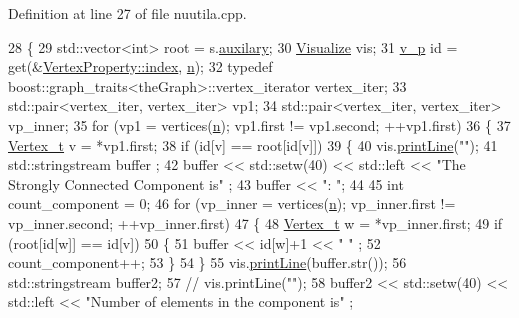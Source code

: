 Definition at line 27 of file nuutila.\+cpp.


\begin{DoxyCode}
28 \{
29     std::vector<int> root = s.\hyperlink{struct_utility_structs_1_1_storage_items_afb9d346eaacb1c5e7f60f559c45910f2}{auxilary}; 
30     \hyperlink{class_visualize}{Visualize} vis;
31     \hyperlink{utilities_8h_a3f4959b3d837fa6351a9414c79280286}{v\_p} \textcolor{keywordtype}{id} = \textcolor{keyword}{get}(&\hyperlink{struct_utility_structs_1_1_vertex_property_a636cb729438e999aa3d9a17ac39d8641}{VertexProperty::index}, \hyperlink{class_nuutila_a1409929fa0f38709497f8bdb012af71c}{n});
32     \textcolor{keyword}{typedef} boost::graph\_traits<theGraph>::vertex\_iterator vertex\_iter;
33     std::pair<vertex\_iter, vertex\_iter> vp1;
34     std::pair<vertex\_iter, vertex\_iter> vp\_inner;
35     \textcolor{keywordflow}{for} (vp1 = vertices(\hyperlink{class_nuutila_a1409929fa0f38709497f8bdb012af71c}{n}); vp1.first != vp1.second; ++vp1.first)
36     \{
37         \hyperlink{utilities_8h_a344cd987714d06997f0becda3c96d6e2}{Vertex\_t} v = *vp1.first;
38         \textcolor{keywordflow}{if} (\textcolor{keywordtype}{id}[v] == root[\textcolor{keywordtype}{id}[v]])
39         \{   
40             vis.\hyperlink{class_visualize_abce6cd538dc0715b21851e0bf0377d85}{printLine}(\textcolor{stringliteral}{""});
41             std::stringstream buffer ;
42             buffer << std::setw(40) << std::left << \textcolor{stringliteral}{"The Strongly Connected Component is"} ;
43             buffer << \textcolor{stringliteral}{": "};
44             
45             \textcolor{keywordtype}{int} count\_component = 0;
46             \textcolor{keywordflow}{for} (vp\_inner = vertices(\hyperlink{class_nuutila_a1409929fa0f38709497f8bdb012af71c}{n}); vp\_inner.first != vp\_inner.second; ++vp\_inner.first)
47             \{
48                 \hyperlink{utilities_8h_a344cd987714d06997f0becda3c96d6e2}{Vertex\_t} w = *vp\_inner.first;
49                 \textcolor{keywordflow}{if} (root[\textcolor{keywordtype}{id}[w]] == \textcolor{keywordtype}{id}[v])
50                 \{
51                     buffer << \textcolor{keywordtype}{id}[w]+1 << \textcolor{stringliteral}{" "} ;
52                     count\_component++;
53                 \}
54             \}
55             vis.\hyperlink{class_visualize_abce6cd538dc0715b21851e0bf0377d85}{printLine}(buffer.str());
56             std::stringstream buffer2;
57            \textcolor{comment}{// vis.printLine("");}
58             buffer2 << std::setw(40) << std::left << \textcolor{stringliteral}{"Number of elements in the component is"} ;

\end{DoxyCode}
